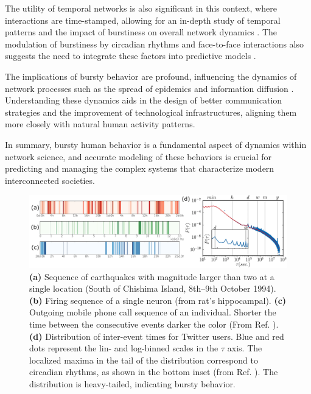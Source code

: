 The utility of temporal networks is also significant in this context, where interactions are time-stamped, allowing for an in-depth study of temporal patterns and the impact of burstiness on overall network dynamics \cite{Holme2012Temporal}. The modulation of burstiness by circadian rhythms and face-to-face interactions also suggests the need to integrate these factors into predictive models \cite{Jo2012Circadian, Starnini2013FaceToFace, Stopczynski2014HighRes,Clauset2007Proximity}.

The implications of bursty behavior are profound, influencing the dynamics of network processes such as the spread of epidemics and information diffusion \cite{Rocha2013Bursts, Wang2009Viruses, Lazer2009CompSocSci}. Understanding these dynamics aids in the design of better communication strategies and the improvement of technological infrastructures, aligning them more closely with natural human activity patterns.


In summary, bursty human behavior is a fundamental aspect of dynamics within network science, and accurate modeling of these behaviors is crucial for predicting and managing the complex systems that characterize modern interconnected societies.

\begin{figure}
    \centering
    \captionsetup{font=sf}
    \includegraphics[width=\textwidth]{Figs/Introduction/bursty.png}
    \caption[Bursty human dynamics: examples and distribution]{\textbf{(a)} Sequence of earthquakes with magnitude larger than two at a single location (South of Chishima Island, 8th–9th October 1994). \textbf{(b)} Firing sequence of a single neuron (from rat's hippocampal). \textbf{(c)} Outgoing mobile phone call sequence of an individual. Shorter the time between the consecutive events darker the color (From Ref. \cite{karsai2012universal}). \textbf{(d)} Distribution of inter-event times for Twitter users. Blue and red dots represent the lin- and log-binned scales in the $\tau$ axis. The localized maxima in the tail of the distribution correspond to circadian rhythms, as shown in the bottom inset  (from Ref. \cite{artime-2017}). The distribution is heavy-tailed, indicating bursty behavior.}
    \label{fig:bursty_human_dynamics}
\end{figure}


